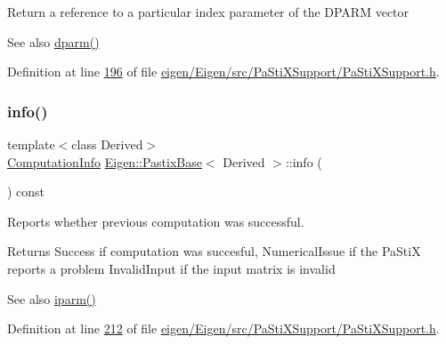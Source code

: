 Return a reference to a particular index parameter of the D\+P\+A\+RM vector \begin{DoxySeeAlso}{See also}
\hyperlink{class_eigen_1_1_pastix_base_af4a29373aa3e6a980738efde33f92a76}{dparm()} 
\end{DoxySeeAlso}


Definition at line \hyperlink{eigen_2_eigen_2src_2_pa_sti_x_support_2_pa_sti_x_support_8h_source_l00196}{196} of file \hyperlink{eigen_2_eigen_2src_2_pa_sti_x_support_2_pa_sti_x_support_8h_source}{eigen/\+Eigen/src/\+Pa\+Sti\+X\+Support/\+Pa\+Sti\+X\+Support.\+h}.

\mbox{\label{class_eigen_1_1_pastix_base_a436e99a385c9c019be9627cc1fa884cf}} 
\subsubsection{\texorpdfstring{info()}{info()}\hspace{0.1cm}{\footnotesize\ttfamily [1/2]}}
{\footnotesize\ttfamily template$<$class Derived$>$ \\
\hyperlink{group__enums_ga85fad7b87587764e5cf6b513a9e0ee5e}{Computation\+Info} \hyperlink{class_eigen_1_1_pastix_base}{Eigen\+::\+Pastix\+Base}$<$ Derived $>$\+::info (\begin{DoxyParamCaption}{ }\end{DoxyParamCaption}) const\hspace{0.3cm}{\ttfamily [inline]}}



Reports whether previous computation was successful. 

\begin{DoxyReturn}{Returns}
{\ttfamily Success} if computation was succesful, {\ttfamily Numerical\+Issue} if the Pa\+StiX reports a problem {\ttfamily Invalid\+Input} if the input matrix is invalid
\end{DoxyReturn}
\begin{DoxySeeAlso}{See also}
\hyperlink{class_eigen_1_1_pastix_base_a38378e7b2b5c750a8a23e2c21a69146c}{iparm()} 
\end{DoxySeeAlso}


Definition at line \hyperlink{eigen_2_eigen_2src_2_pa_sti_x_support_2_pa_sti_x_support_8h_source_l00212}{212} of file \hyperlink{eigen_2_eigen_2src_2_pa_sti_x_support_2_pa_sti_x_support_8h_source}{eigen/\+Eigen/src/\+Pa\+Sti\+X\+Support/\+Pa\+Sti\+X\+Support.\+h}.

